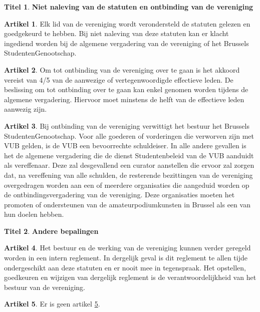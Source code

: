 \documentclass[a4paper,10pt]{article}
\theoremstyle{definition}
\newtheorem{titel}{\newline\Large Titel}
\newtheorem{artikel}{\large Artikel}
\newenvironment{artikelbis}
  {\addtocounter{artikel}{-1}
   \renewcommand{\theartikel}{\arabic{artikel}.bis}
   \begin{artikel}}
  {\end{artikel}}
\newcommand{\ttext}[1]{\Large \textbf{#1} \normalsize}
\newcommand{\ttextcr}{\hfill\newline}
\begin{document}

\begin{titel}\ttext{Niet naleving van de statuten en ontbinding van de vereniging}

  \begin{artikel}\ttextcr
    Elk lid van de vereniging wordt verondersteld de statuten gelezen en goedgekeurd te hebben.
    Bij niet naleving van deze statuten kan er klacht ingediend worden bij de algemene vergadering van de vereniging of het Brussels StudentenGenootschap.
  \end{artikel}

  \begin{artikel}\ttextcr
    Om tot ontbinding van de vereniging over te gaan is het akkoord vereist van 4/5 van de aanwezige of vertegenwoordigde effectieve leden.
    De beslissing om tot ontbinding over te gaan kan enkel genomen worden tijdens de algemene vergadering.
    Hiervoor moet minstens de helft van de effectieve leden aanwezig zijn.
  \end{artikel}

  \begin{artikel}\ttextcr
    Bij ontbinding van de vereniging verwittigt het bestuur het Brussels StudentenGenootschap.
    Voor alle goederen of vorderingen die verworven zijn met VUB gelden, is de VUB een bevoorrechte schuldeiser.
    In alle andere gevallen is het de algemene vergadering die de dienst Studentenbeleid van de VUB aanduidt als vereffenaar.
    Deze zal desgevallend een curator aanstellen die ervoor zal zorgen dat, na vereffening van alle schulden, de resterende bezittingen van de vereniging overgedragen worden aan een of meerdere organisaties die aangeduid worden op de ontbindingsvergadering van de vereniging.
    Deze organisaties moeten het promoten of ondersteunen van de amateurpodiumkunsten in Brussel als een van hun doelen hebben.
  \end{artikel}

\end{titel}


\begin{titel}\ttext{Andere bepalingen}

  \begin{artikel}\label{varia-reglement}\ttextcr
    Het bestuur en de werking van de vereniging kunnen verder geregeld worden in een intern reglement.
    In dergelijk geval is dit reglement te allen tijde ondergeschikt aan deze statuten en er nooit mee in tegenspraak.
    Het opstellen, goedkeuren en wijzigen van dergelijk reglement is de verantwoordelijkheid van het bestuur van de vereniging.
  \end{artikel}

  \begin{artikelbis}\label{varia-bis}\ttextcr
    Er is geen artikel \ref{varia-bis}.
  \end{artikelbis}

\end{titel}
\end{document}
